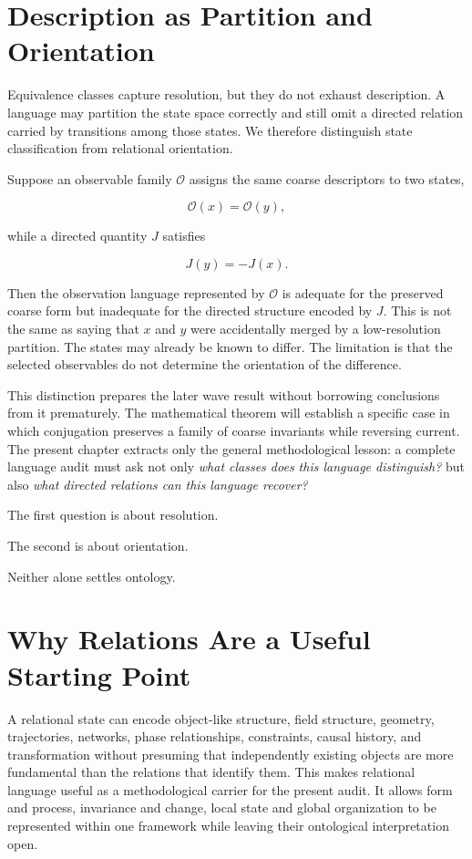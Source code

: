 \section{Description as Partition and Orientation}

Equivalence classes capture resolution, but they do not exhaust description. A language may partition the state space correctly and still omit a directed relation carried by transitions among those states. We therefore distinguish state classification from relational orientation.

Suppose an observable family $\mathcal O$ assigns the same coarse descriptors to two states,

\[
\mathcal O(x)=\mathcal O(y),
\]

while a directed quantity $J$ satisfies

\[
J(y)=-J(x).
\]

Then the observation language represented by $\mathcal O$ is adequate for the preserved coarse form but inadequate for the directed structure encoded by $J$. This is not the same as saying that $x$ and $y$ were accidentally merged by a low-resolution partition. The states may already be known to differ. The limitation is that the selected observables do not determine the orientation of the difference.

This distinction prepares the later wave result without borrowing conclusions from it prematurely. The mathematical theorem will establish a specific case in which conjugation preserves a family of coarse invariants while reversing current. The present chapter extracts only the general methodological lesson: a complete language audit must ask not only \emph{what classes does this language distinguish?} but also \emph{what directed relations can this language recover?}

The first question is about resolution.

The second is about orientation.

Neither alone settles ontology.

\section{Why Relations Are a Useful Starting Point}

A relational state can encode object-like structure, field structure, geometry, trajectories, networks, phase relationships, constraints, causal history, and transformation without presuming that independently existing objects are more fundamental than the relations that identify them. This makes relational language useful as a methodological carrier for the present audit. It allows form and process, invariance and change, local state and global organization to be represented within one framework while leaving their ontological interpretation open.

